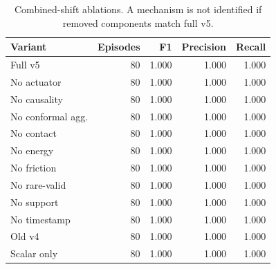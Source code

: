 \begin{table}[t]
\centering
\caption{Combined-shift ablations. A mechanism is not identified if removed components match full v5.}
\label{tab:ablation-combined}
\scriptsize
\begin{tabular}{lrrrr}
\toprule
Variant & Episodes & F1 & Precision & Recall \\
\midrule
Full v5 & 80 & 1.000 & 1.000 & 1.000 \\
No actuator & 80 & 1.000 & 1.000 & 1.000 \\
No causality & 80 & 1.000 & 1.000 & 1.000 \\
No conformal agg. & 80 & 1.000 & 1.000 & 1.000 \\
No contact & 80 & 1.000 & 1.000 & 1.000 \\
No energy & 80 & 1.000 & 1.000 & 1.000 \\
No friction & 80 & 1.000 & 1.000 & 1.000 \\
No rare-valid & 80 & 1.000 & 1.000 & 1.000 \\
No support & 80 & 1.000 & 1.000 & 1.000 \\
No timestamp & 80 & 1.000 & 1.000 & 1.000 \\
Old v4 & 80 & 1.000 & 1.000 & 1.000 \\
Scalar only & 80 & 1.000 & 1.000 & 1.000 \\
\bottomrule
\end{tabular}
\end{table}
